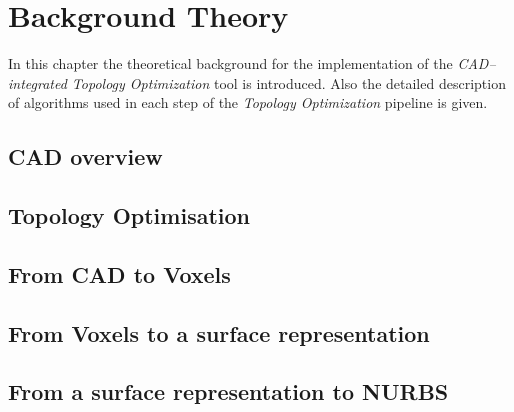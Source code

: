 \chapter{Background Theory}
In this chapter the theoretical background for the implementation of the \textit{CAD--integrated Topology Optimization} tool is introduced.  Also the detailed description of algorithms used in each step of the \textit{Topology Optimization} pipeline is given.
\label{chapter:Background}

\section{CAD overview}


\section{Topology Optimisation}


\section{From CAD to Voxels}


\section{From Voxels to a surface representation}


\section{From a surface representation to NURBS}
\label{sec:NURBS}



